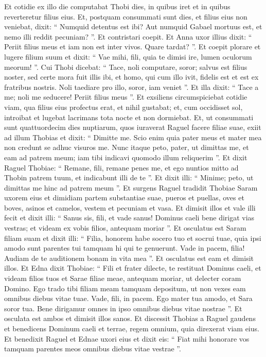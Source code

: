 \begin{biblechapter}
\begin{biblechapter}
\begin{biblechapter}
\begin{biblechapter}
\begin{biblechapter}
\begin{biblechapter}
\begin{biblechapter}
\begin{biblechapter}
\begin{biblechapter}
\begin{biblechapter}
\verse Et cotidie ex illo die computabat Thobi dies, in quibus iret et in quibus reverteretur filius eius. Et, postquam consummati sunt dies, et filius eius non veniebat, 
\verse dixit: “ Numquid detentus est ibi? Aut numquid Gabael mortuus est, et nemo illi reddit pecuniam? ”. 
\verse Et contristari coepit. 
\verse Et Anna uxor illius dixit: “ Periit filius meus et iam non est inter vivos. Quare tardat? ”. Et coepit plorare et lugere filium suum et dixit: 
\verse “ Vae mihi, fili, quia te dimisi ire, lumen oculorum meorum! ”. 
\verse Cui Thobi dicebat: “ Tace, noli computare, soror; salvus est filius noster, sed certe mora fuit illis ibi, et homo, qui cum illo ivit, fidelis est et est ex fratribus nostris. Noli taediare pro illo, soror, iam veniet ”. 
\verse Et illa dixit: “ Tace a me; noli me seducere! Periit filius meus ”. Et exsiliens circumspiciebat cotidie viam, qua filius eius profectus erat, et nihil gustabat; et, cum occidisset sol, introibat et lugebat lacrimans tota nocte et non dormiebat.
 Et, ut consummati sunt quattuordecim dies nuptiarum, quos iuraverat Raguel facere filiae suae, exiit ad illum Thobias et dixit: “ Dimitte me. Scio enim quia pater meus et mater mea non credunt se adhuc visuros me. Nunc itaque peto, pater, ut dimittas me, et eam ad patrem meum; iam tibi indicavi quomodo illum reliquerim ”. 
\verse Et dixit Raguel Thobiae: “ Remane, fili, remane penes me, et ego nuntios mitto ad Thobin patrem tuum, et indicabunt illi de te ”. 
\verse Et dixit illi: “ Minime; peto, ut dimittas me hinc ad patrem meum ”. 
\verse Et surgens Raguel tradidit Thobiae Saram uxorem eius et dimidiam partem substantiae suae, pueros et puellas, oves et boves, asinos et camelos, vestem et pecuniam et vasa. 
\verse Et dimisit illos et vale illi fecit et dixit illi: “ Sanus sis, fili, et vade sanus! Dominus caeli bene dirigat vias vestras; et videam ex vobis filios, antequam moriar ”. 
\verse Et osculatus est Saram filiam suam et dixit illi: “ Filia, honorem habe socero tuo et socrui tuae, quia ipsi amodo sunt parentes tui tamquam hi qui te genuerunt. Vade in pacem, filia! Audiam de te auditionem bonam in vita mea ”. Et osculatus est eam et dimisit illos. Et Edna dixit Thobiae: “ Fili et frater dilecte, te restituat Dominus caeli, et videam filios tuos et Sarae filiae meae, antequam moriar, ut delecter coram Domino. Ego trado tibi filiam meam tamquam depositum, ut non vexes eam omnibus diebus vitae tuae. Vade, fili, in pacem. Ego mater tua amodo, et Sara soror tua. Bene dirigamur omnes in ipso omnibus diebus vitae nostrae ”. Et osculata est ambos et dimisit illos sanos. 
\verse Et discessit Thobias a Raguel gaudens et benedicens Dominum caeli et terrae, regem omnium, quia direxerat viam eius. Et benedixit Raguel et Ednae uxori eius et dixit eis: “ Fiat mihi honorare vos tamquam parentes meos omnibus diebus vitae vestrae ”.
 

\end{biblechapter}
\end{biblechapter}
\end{biblechapter}
\end{biblechapter}
\end{biblechapter}
\end{biblechapter}
\end{biblechapter}
\end{biblechapter}
\end{biblechapter}
\end{biblechapter}
